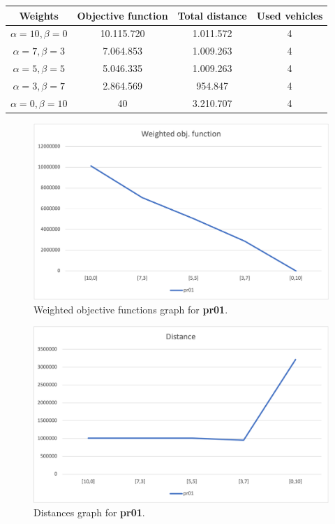 {
\renewcommand{\arraystretch}{2}
\begin{longtable}[h]{| c | c | c | c |}
    \hline
    \textbf{Weights} & \textbf{Objective function} & \textbf{Total distance} & \textbf{Used vehicles} \\
    \hline
    \endhead
    $\alpha = 10, \beta = 0$ & 10.115.720 & 1.011.572 & 4 \\
    \hline
    $\alpha = 7, \beta = 3$  &  7.064.853 & 1.009.263 & 4 \\
    \hline
    $\alpha = 5, \beta = 5$  &  5.046.335 & 1.009.263 & 4 \\
    \hline
    $\alpha = 3, \beta = 7$  &  2.864.569 &   954.847 & 4 \\
    \hline
    $\alpha = 0, \beta = 10$ &         40 & 3.210.707 & 4 \\
    \hline
\end{longtable}
}
\begin{figure}[H]
    \centering
    \includegraphics[height=0.25\textheight]{../graphs/pr01-wobjf.png}
    \caption{Weighted objective functions graph for \textbf{pr01}.}
\end{figure}

\begin{figure}[H]
    \centering
    \includegraphics[height=0.25\textheight]{../graphs/pr01-distance.png}
    \caption{Distances graph for \textbf{pr01}.}
\end{figure}

